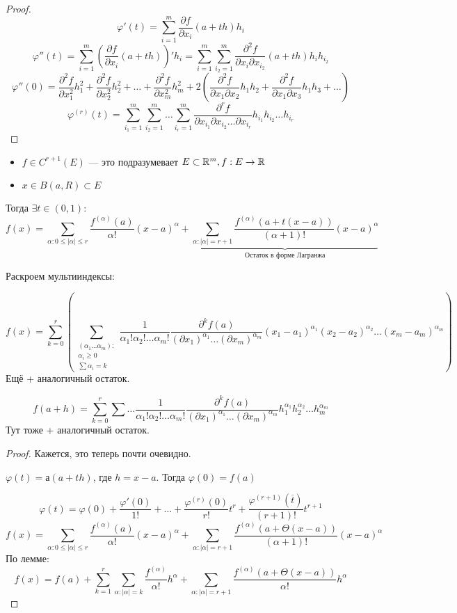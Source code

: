 \begin{proof}
    $$\varphi'(t)=\sum_{i=1}^m \frac{\partial f}{\partial x_i}(a+th)h_i$$
    $$\varphi''(t)=\sum_{i=1}^m \left(\frac{\partial f}{\partial x_i}(a+th)\right)'h_i=\sum_{i=1}^m \sum_{i_2=1}^m \frac{\partial^2 f}{\partial x_i\partial x_{i_2}}(a+th)h_ih_{i_2}$$
    $$\varphi''(0)=\frac{\partial^2 f}{\partial x_1^2}h_1^2 + \frac{\partial^2 f}{\partial x_2^2}h_2^2 + \ldots + \frac{\partial^2 f}{\partial x_m^2}h_m^2 + 2\left( \frac{\partial^2 f}{\partial x_1\partial x_2}h_1h_2 + \frac{\partial^2 f}{\partial x_1\partial x_3}h_1h_3 + \ldots \right)$$
    $$\varphi^{(r)}(t)=\sum_{i_1=1}^m\sum_{i_2=1}^m\ldots \sum_{i_r=1}^m \frac{\partial^r f}{\partial x_{i_1}\partial x_{i_2}\ldots \partial x_{i_r}} h_{i_1}h_{i_2}\ldots h_{i_r}$$
\end{proof}

\begin{theorem}
    \itemfix
    \begin{itemize}
        \item $f\in C^{r+1}(E)$ --- это подразумевает $E\subset\mathbb{R}^m, f:E\to\mathbb{R}$
        \item $x\in B(a, R)\subset E$
    \end{itemize}
    Тогда $\exists t\in(0, 1)$:
    $$f(x) = \sum_{\alpha : 0\le |\alpha|\le r} \frac{f^{(\alpha)}(a)}{\alpha!}(x-a)^\alpha + \underbrace{\sum_{\alpha : |\alpha|=r+1} \frac{f^{(\alpha)}(a+t(x-a))}{(\alpha+1)!}(x-a)^\alpha}_{\text{Остаток в форме Лагранжа}}$$
\end{theorem}

Раскроем мультииндексы:

$$f(x)=\sum_{k=0}^r\left( \sum_{\substack{(\alpha_1\ldots \alpha_m): \\ \alpha_i\ge 0 \\ \sum \alpha_i = k}} \frac{1}{\alpha_1!\alpha_2!\ldots\alpha_m!} \frac{\partial^k f(a)}{(\partial x_1)^{\alpha_1}\ldots (\partial x_m)^{\alpha_m}} (x_1-a_1)^{\alpha_1}(x_2-a_2)^{\alpha_2}\ldots (x_m-a_m)^{\alpha_m} \right)$$
Ещё + аналогичный остаток.

$$f(a+h)=\sum_{k=0}^r\sum\ldots \frac{1}{\alpha_1!\alpha_2!\ldots\alpha_m!} \frac{\partial^k f(a)}{(\partial x_1)^{\alpha_1}\ldots (\partial x_m)^{\alpha_m}} h_1^{\alpha_1}h_2^{\alpha_2}\ldots h_m^{\alpha_m}$$
Тут тоже + аналогичный остаток.

\begin{proof}
    Кажется, это теперь почти очевидно.

    $\varphi(t) = а(a+th)$, где $h=x-a$. Тогда $\varphi(0)=f(a)$

    $$\varphi(t) = \varphi(0) + \frac{\varphi'(0)}{1!}+\ldots+\frac{\varphi^{(r)}(0)}{r!}t^r+\frac{\varphi^{(r+1)}(\overline t)}{(r+1)!}t^{r+1}$$
    $$f(x) = \sum_{\alpha : 0\le |\alpha|\le r} \frac{f^{(\alpha)}(a)}{\alpha!}(x-a)^\alpha + \sum_{\alpha : |\alpha| = r+1} \frac{f^{(\alpha)}(a+\Theta(x-a))}{(\alpha+1)!}(x-a)^\alpha$$
    По лемме:
    $$f(x)=f(a) + \sum_{k=1}^r\sum_{\alpha : |\alpha|=k}\frac{f^{(\alpha)}}{\alpha!}h^\alpha + \sum_{\alpha : |\alpha| = r+1} \frac{f^{(\alpha)}(a+\Theta(x-a))}{\alpha!}h^\alpha$$
\end{proof}

